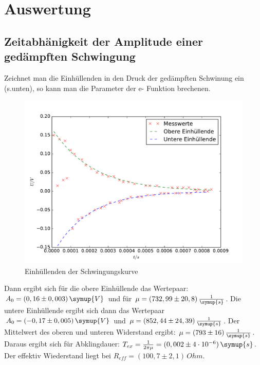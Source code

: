 \section{Auswertung}
\label{sec:Auswertung}
\subsection{Zeitabhänigkeit der Amplitude einer gedämpften Schwingung}
    Zeichnet man die Einhüllenden in den Druck der gedämpften Schwinung ein
    (s.unten), so kann man die Parameter der e- Funktion brechenen.
    \begin{figure}
      \centering
      \includegraphics[width=\textwidth]{./logos/5aplot.pdf}
        \caption{Einhüllenden der Schwingungskurve}
        \label{fig:5aplot}
      \end{figure}
\FloatBarrier
    Dann ergibt sich für die obere Einhüllende das Wertepaar:
    $ A_0 = (0,16 \pm 0,003) \, \symup{V} $ und für $ \mu =  (732,99 \pm 20,8)\, \frac{1}{\symup{s}} $.
    Die untere Einhüllende ergibt sich dann das Wertepaar
    $ A_0 = (-0,17 \pm 0,005) \, \symup{V} $ und $ \mu =  (852,44 \pm 24,39) \, \frac{1}{\symup{s}} $.
    Der Mittelwert des oberen und unteren Widerstand ergibt:
    $ \mu = (793 \pm 16) \, \frac{1}{\symup{s}} $.
    Daraus ergibt sich für Abklingdauer:
    $T_{ex} = \frac{1}{2\pi\mu} = (0,002 \pm 4\cdot10^{-6}) \, \symup{s} $.
    Der effektiv Wiederstand liegt bei
    $ R_{eff} = (100,7 \pm 2,1) \, \si{Ohm} $.
